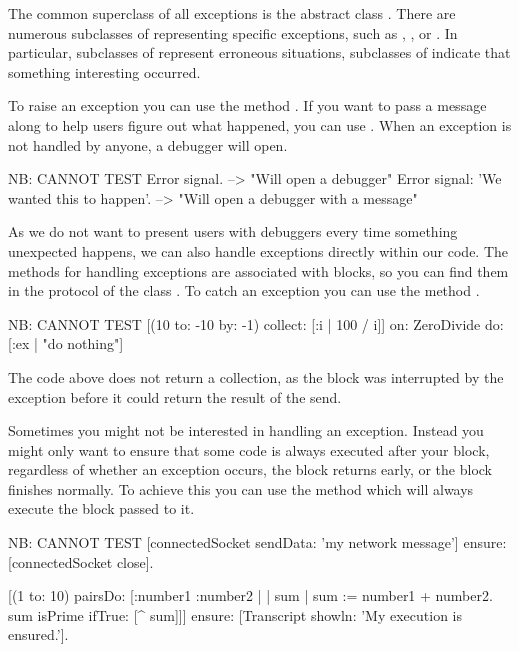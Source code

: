 \documentclass[a4paper,10pt,twoside]{book}
\begin{document}
The common superclass of all exceptions is the abstract class .
There are numerous subclasses of  representing specific exceptions, such as , , or .
In particular, subclasses of  represent erroneous situations, subclasses of  indicate that something interesting occurred.

To raise an exception you can use the method .
If you want to pass a message along to help users figure out what happened, you can use .
When an exception is not handled by anyone, a debugger will open.

\begin{code}{NB: CANNOT TEST}
Error signal. --> "Will open a debugger"
Error signal: 'We wanted this to happen'. --> "Will open a debugger with a message"
\end{code}

As we do not want to present users with debuggers every time something unexpected happens, we can also handle exceptions directly within our code.
The methods for handling exceptions are associated with blocks, so you can find them in the  protocol of the class .
To catch an exception you can use the method .

\begin{code}{NB: CANNOT TEST}
[(10 to: -10 by: -1) collect: [:i | 100 / i]] 
   on: ZeroDivide
   do: [:ex | "do nothing"]
\end{code}

The code above does not return a collection, as the block was interrupted by the  exception before it could return the result of the  send.

Sometimes you might not be interested in handling an exception. 
Instead you might only want to ensure that some code is always executed after your block, regardless of whether an exception occurs, the block returns early, or the block finishes normally.
To achieve this you can use the method  which will always execute the block passed to it.

\begin{code}{NB: CANNOT TEST}
[connectedSocket sendData: 'my network message'] 
   ensure: [connectedSocket close].

[(1 to: 10) pairsDo: [:number1 :number2 | | sum |
	sum := number1 + number2.
	sum isPrime ifTrue: [^ sum]]]
		ensure: [Transcript showln: 'My execution is ensured.'].
\end{code}
\end{document}
